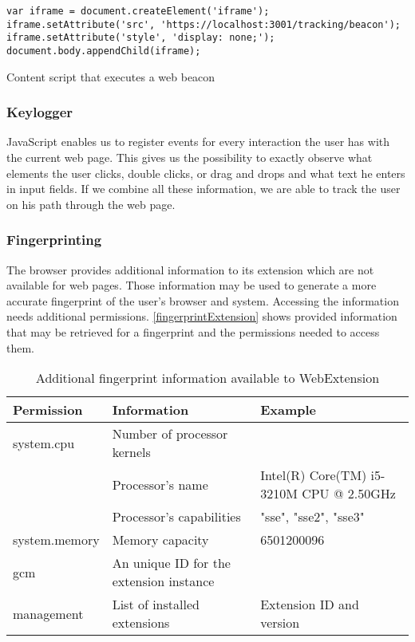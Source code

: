 			\begin{code}
				\begin{lstlisting}
var iframe = document.createElement('iframe');
iframe.setAttribute('src', 'https://localhost:3001/tracking/beacon');
iframe.setAttribute('style', 'display: none;');
document.body.appendChild(iframe);
\end{lstlisting}
				\caption{Content script that executes a web beacon}
				\label{contentScriptWebBeacon}
			\end{code}
		
		\subsubsection{Keylogger} 
		
			JavaScript enables us to register events for every interaction the user has with the current web page. This gives us the possibility to exactly observe what elements the user clicks, double clicks, or drag and drops and what text he enters in input fields. If we combine all these information, we are able to track the user on his path through the web page. 
		
		\subsubsection{Fingerprinting} 
			
			The browser provides additional information to its extension which are not available for web pages. Those information may be used to generate a more accurate fingerprint of the user's browser and system. Accessing the information needs additional permissions. \autoref{fingerprintExtension} shows provided information that may be retrieved for a fingerprint and the permissions needed to access them. \\
		
			\begin{table}[h]
				\begin{tabular}{|l|l|l|} \hline
					\textbf{Permission} & \textbf{Information} & \textbf{Example} \\ \hline
					system.cpu & Number of processor kernels & \\
					& Processor's name & Intel(R) Core(TM) i5-3210M CPU @ 2.50GHz \\
					& Processor's capabilities & "sse", "sse2", "sse3"  \\ \hline
					system.memory & Memory capacity & 6501200096 \\ \hline
					gcm & An unique ID for the extension instance & \\ \hline
					management & List of installed extensions & Extension ID and version \\ \hline
				\end{tabular}
				\caption{Additional fingerprint information available to WebExtension}
				\label{fingerprintExtension}
			\end{table} 


